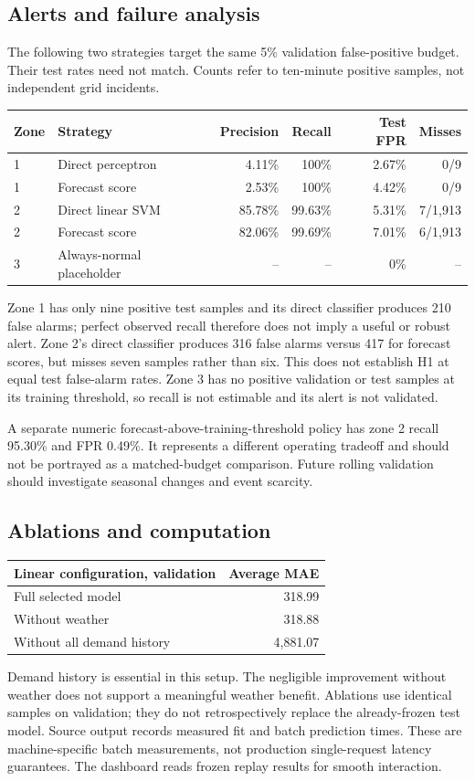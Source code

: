 \documentclass[11pt,a4paper]{article}
\begin{document}
\subsection{Alerts and failure analysis}
The following two strategies target the same 5\% validation false-positive budget. Their test rates need not match. Counts refer to ten-minute positive samples, not independent grid incidents.
\begin{center}\small
\begin{tabular}{llrrrr}\toprule
Zone & Strategy & Precision & Recall & Test FPR & Misses\\\midrule
1 & Direct perceptron & 4.11\% & 100\% & 2.67\% & 0/9\\
1 & Forecast score & 2.53\% & 100\% & 4.42\% & 0/9\\
2 & Direct linear SVM & 85.78\% & 99.63\% & 5.31\% & 7/1,913\\
2 & Forecast score & 82.06\% & 99.69\% & 7.01\% & 6/1,913\\
3 & Always-normal placeholder & -- & -- & 0\% & --\\\bottomrule
\end{tabular}\end{center}
Zone 1 has only nine positive test samples and its direct classifier produces 210 false alarms; perfect observed recall therefore does not imply a useful or robust alert. Zone 2's direct classifier produces 316 false alarms versus 417 for forecast scores, but misses seven samples rather than six. This does not establish H1 at equal test false-alarm rates. Zone 3 has no positive validation or test samples at its training threshold, so recall is not estimable and its alert is not validated.

A separate numeric forecast-above-training-threshold policy has zone 2 recall 95.30\% and FPR 0.49\%. It represents a different operating tradeoff and should not be portrayed as a matched-budget comparison. Future rolling validation should investigate seasonal changes and event scarcity.

\subsection{Ablations and computation}
\begin{center}
\begin{tabular}{lr}\toprule
Linear configuration, validation & Average MAE\\\midrule
Full selected model & 318.99\\
Without weather & 318.88\\
Without all demand history & 4,881.07\\\bottomrule
\end{tabular}\end{center}
Demand history is essential in this setup. The negligible improvement without weather does not support a meaningful weather benefit. Ablations use identical samples on validation; they do not retrospectively replace the already-frozen test model. Source output records measured fit and batch prediction times. These are machine-specific batch measurements, not production single-request latency guarantees. The dashboard reads frozen replay results for smooth interaction.
\end{document}
